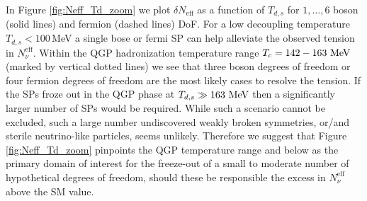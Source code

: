 In Figure \ref{fig:Neff_Td_zoom} we plot $\delta N_{\text{eff}}$ as a function of $T_{d,s}$ for $1,\dots,6$ boson (solid lines) and fermion (dashed lines) DoF. For a low decoupling temperature $T_{d,s}<100$\,MeV  a single bose or fermi SP  can help alleviate the observed tension in $N^{\text{eff}}_{\nu}$. Within the QGP hadronization temperature range  $T_c=142-163\text{ MeV}$ (marked by vertical dotted lines) we see that three boson degrees of freedom or four fermion degrees of freedom are the most likely cases to resolve the tension. If the SPs froze out in the QGP phase at $T_{d,s}\gg 163\text{ MeV}$ then a significantly larger number of SPs would be required. While such a scenario cannot be excluded, such a large number undiscovered weakly broken symmetries, or/and sterile neutrino-like particles, seems unlikely. Therefore we suggest that Figure \ref{fig:Neff_Td_zoom}  pinpoints the QGP  temperature range and below as the primary domain of interest for the freeze-out of a small to moderate number of hypothetical degrees of freedom, should these be responsible the excess in $N_\nu^{\text{eff}}$ above  the SM value.





